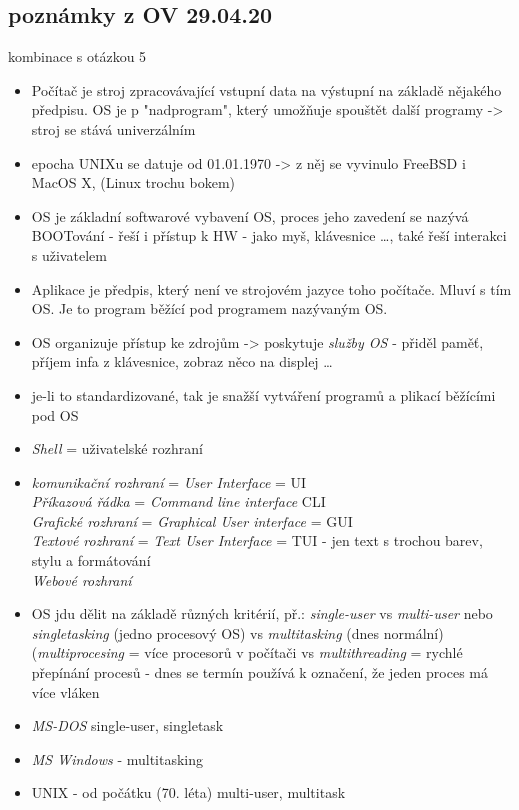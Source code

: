 \documentclass[12pt]{article}
\begin{document}
\subsection{poznámky z OV 29.04.20}
\label{sec:OV_OS}
kombinace s otázkou 5
\begin{itemize}
\item Počítač je stroj zpracovávající vstupní data na výstupní na základě nějakého předpisu. OS je p "nadprogram", který umožňuje spouštět další programy -> stroj se stává univerzálním
\item epocha UNIXu se datuje od 01.01.1970 -> z něj se vyvinulo FreeBSD i MacOS X, (Linux trochu bokem)
\item OS je základní softwarové vybavení OS, proces jeho zavedení se nazývá BOOTování
 - řeší i přístup k HW - jako myš, klávesnice \dots , také řeší interakci s uživatelem
\item Aplikace je předpis, který není ve strojovém jazyce toho počítače. Mluví s tím OS. Je to program běžící pod programem nazývaným OS.
\item OS organizuje přístup ke zdrojům -> poskytuje \emph{služby OS} - přiděl paměť, příjem infa z klávesnice, zobraz něco na displej \dots
\item je-li to standardizované, tak je snažší vytváření programů a plikací běžícími pod OS
\item \emph{Shell} = uživatelské rozhraní
\item \emph{komunikační rozhraní } = \emph{User Interface} = UI \\
\emph{Příkazová řádka} = \emph{Command line interface} CLI\\
\emph{Grafické rozhraní} = \emph{Graphical User interface}  = GUI\\
\emph{Textové rozhraní} = \emph{Text User Interface} = TUI - jen text s trochou barev, stylu a formátování\\
\emph{Webové rozhraní}
\item OS jdu dělit na základě různých kritérií, př.: \emph{single-user} vs \emph{multi-user} nebo \emph{singletasking} (jedno procesový OS) vs \emph{multitasking} (dnes normální) (\emph{multiprocesing} = více procesorů v počítači vs \emph{multithreading} = rychlé přepínání procesů - dnes se termín používá k označení, že jeden proces má více vláken
\item \emph{MS-DOS} single-user, singletask
\item \emph{MS Windows} - multitasking
\item UNIX - od počátku (70. léta) multi-user, multitask

\end{itemize}
\end{document}
